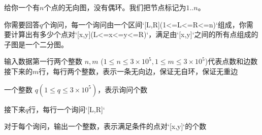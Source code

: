 给你一个有$n$个点的无向图，没有偶环。我们把节点标记为$1..n$。

你需要回答$q$个询问，每一个询问由一个区间`[L,R](1<=L<=R<=n)`组成，你需要计算出有多少个点对`[x,y](L<=x<=y<=R)`，满足由`[x,y]`之间的所有点组成的子图是一个二分图。

输入数据第一行两个整数 $n,m$ ($1\le n\le 3\times 10^5,1\le m\le 3\times10^5$)代表点数和边数
接下来的$m$行，每行两个整数，表示一条无向边，保证无自环，保证无重边

一个整数 $q(1\le q\le3\times 10^5)$，表示询问个数

接下来$q$行，每行一个询问`[L,R]`

对于每个询问，输出一个整数，表示满足条件的点对`[x,y]`的个数